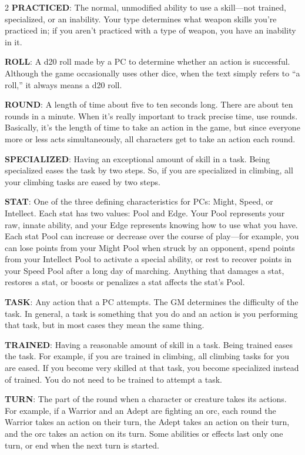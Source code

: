 \begin{multicols}{2}
\textbf{PRACTICED}: The normal, unmodified ability to use a skill—not trained, specialized, or an inability. Your type determines what weapon skills you’re practiced in; if you aren’t practiced with a type of weapon, you have an inability in it. 

\textbf{ROLL}: A d20 roll made by a PC to determine whether an action is successful. Although the game occasionally uses other dice, when the text simply refers to “a roll,” it always means a d20 roll.

\textbf{ROUND}: A length of time about five to ten seconds long. There are about ten rounds in a minute. When it’s really important to track precise time, use rounds. Basically, it’s the length of time to take an action in the game, but since everyone more or less acts simultaneously, all characters get to take an action each round.

\textbf{SPECIALIZED}: Having an exceptional amount of skill in a task. Being specialized eases the task by two steps. So, if you are specialized in climbing, all your climbing tasks are eased by two steps.

\textbf{STAT}: One of the three defining characteristics for PCs: Might, Speed, or Intellect. Each stat has two values: Pool and Edge. Your Pool represents your raw, innate ability, and your Edge represents knowing how to use what you have. Each stat Pool can increase or decrease over the course of play—for example, you can lose points from your Might Pool when struck by an opponent, spend points from your Intellect Pool to activate a special ability, or rest to recover points in your Speed Pool after a long day of marching. Anything that damages a stat, restores a stat, or boosts or penalizes a stat affects the stat’s Pool.

\textbf{TASK}: Any action that a PC attempts. The GM determines the difficulty of the task. In general, a task is something that you do and an action is you performing that task, but in most cases they mean the same thing.

\textbf{TRAINED}: Having a reasonable amount of skill in a task. Being trained eases the task. For example, if you are trained in climbing, all climbing tasks for you are eased. If you become very skilled at that task, you become specialized instead of trained. You do not need to be trained to attempt a task.

\textbf{TURN}: The part of the round when a character or creature takes its actions. For example, if a Warrior and an Adept are fighting an orc, each round the Warrior takes an action on their turn, the Adept takes an action on their turn, and the orc takes an action on its turn. Some abilities or effects last only one turn, or end when the next turn is started.


\end{multicols}
